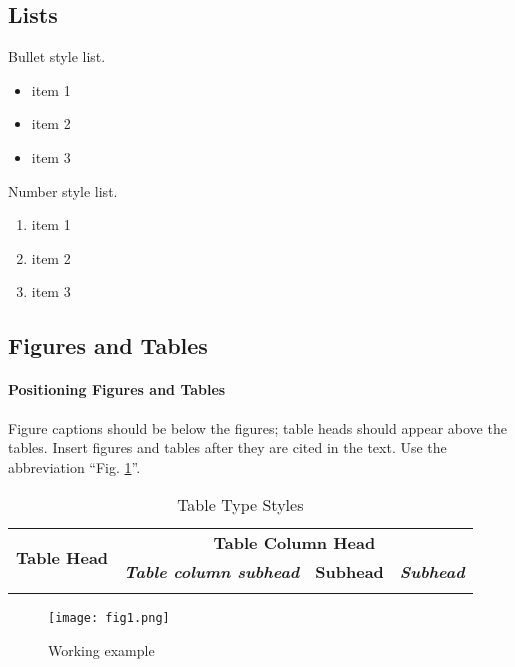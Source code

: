 \documentclass{article}
\begin{document}
\subsection{Lists}
Bullet style list.
\begin{itemize}
    \item item 1
    \item item 2
    \item item 3
\end{itemize}

Number style list.
\begin{enumerate}
    \item item 1
    \item item 2
    \item item 3
\end{enumerate}


\subsection{Figures and Tables}
\paragraph{Positioning Figures and Tables} Figure captions should be below the figures; table heads should appear above the tables. Insert figures and tables after they are cited in the text. Use the abbreviation ``Fig. \ref{CSULB_Logo}''.

\begin{table}[h]
\centering
\caption{Table Type Styles}
\vspace*{5mm}
\begin{tabular}{|l||l|l|l|}
\hline
\multirow{2}{1cm}{\textbf{Table Head}} & \multicolumn{3}{c|}{\textbf{Table Column Head}}                                       \\ \cline{2-4} 
                                     & \textit{\textbf{Table column subhead}} & \textbf{Subhead} & \textit{\textbf{Subhead}} \\ \hline
                                     &                                        &                  &                           \\ \hline
\end{tabular}
\label{Table_1}
\end{table}

\begin{figure}[h]

\centering
\texttt{[image: fig1.png]}
\caption{Working example}
\label{CSULB_Logo}
\end{figure}
\end{document}

